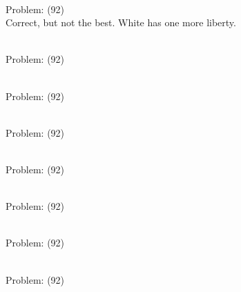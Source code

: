 \documentclass[11pt]{article}
\begin{document}
\begin{minipage}[t]{0.5\textwidth}
  {\centering
  
\\
Problem: (92)\\
Correct, but not the best. White has one more liberty.\\
  }
\end{minipage}
\begin{minipage}[t]{0.5\textwidth}
  {\centering
  
\\
Problem: (92)\\
  }
\end{minipage}
\begin{minipage}[t]{0.5\textwidth}
  {\centering
  
\\
Problem: (92)\\
  }
\end{minipage}
\begin{minipage}[t]{0.5\textwidth}
  {\centering
  
\\
Problem: (92)\\
  }
\end{minipage}
\begin{minipage}[t]{0.5\textwidth}
  {\centering
  
\\
Problem: (92)\\
  }
\end{minipage}
\begin{minipage}[t]{0.5\textwidth}
  {\centering
  
\\
Problem: (92)\\
  }
\end{minipage}
\begin{minipage}[t]{0.5\textwidth}
  {\centering
  
\\
Problem: (92)\\
  }
\end{minipage}
\begin{minipage}[t]{0.5\textwidth}
  {\centering
  
\\
Problem: (92)\\
  }
\end{minipage}
\end{document}
